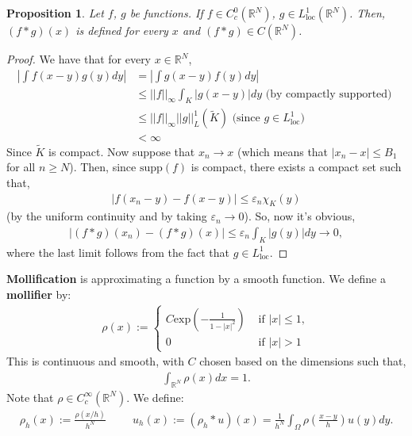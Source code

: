 \documentclass[psamsfonts]{amsart}
\newtheorem{prop}[thm]{Proposition}
\theoremstyle{definition}
\theoremstyle{remark}
\newcommand{\R}[0]{\mathbb{R}}
\newcommand{\eps}[0]{\varepsilon}
\numberwithin{equation}{section}
\begin{document}
\begin{prop}
	Let \( f \), \( g \) be functions. If \( f \in C_c^0(\R^N) \),  \( g \in L^1_{\text{loc}}(\R^N) \). Then, \( (f *g)(x) \) is defined for every \( x \) and \( (f*g) \in C(\R^N) \). 
\end{prop}

\begin{proof}
	We have that for every \( x \in \R^N \), 
	\begin{align*}
		 \left| \int f(x-y)g(y)dy \right| & = \left| \int g(x-y)f(y)dy \right| \\
		 & \leq || f ||_\infty \int_K |g(x-y)| dy \text{ (by compactly supported) } \\
		 & \leq ||f||_\infty ||g||_L^1(\tilde{K}) \text{ (since } g \in L^1_{\text{loc}} \text{)}\\
		 & < \infty 
	\end{align*}
	Since \( \tilde{K} \) is compact. Now suppose that \( x_n \rightarrow x \) (which means that \( |x_n - x| \leq B_1 \) for all \( n \geq N \)). Then, since \( \text{supp}(f) \) is compact, there exists a compact set such that, 
	\begin{align*}
		| f(x_n - y) - f(x-y) | \leq \varepsilon_n \chi_K(y) 
	\end{align*}
	(by the uniform continuity and by taking \( \eps_n \rightarrow 0 \)). So, now it's obvious, 
	\begin{align*}
		| (f*g)(x_n) - (f*g)(x) | \leq \eps_n \int_K |g(y)|dy \rightarrow 0, 
	\end{align*}
	where the last limit follows from the fact that \( g \in L^1_{\text{loc}}\).
\end{proof}

\textbf{Mollification} is approximating a function by a smooth function. We define a \textbf{mollifier} by:
\begin{align*}
	\rho(x) := \begin{cases}
		C \text{exp} \left( - \frac{1}{1-|x|^2} \right) & \text{ if } |x| \leq 1, \\
		0 & \text{ if } |x| > 1
	\end{cases}
\end{align*}
This is continuous and smooth, with \( C \) chosen based on the dimensions such that, 
\begin{align*}
		\int_{\R^N} \rho(x) dx = 1.
\end{align*}
Note that \( \rho \in C_c^\infty (\R^N) \). We define: 
\begin{align*}
	\rho_h(x) := \frac{\rho(x/h)}{h^N} \hspace{1cm} u_h(x) := (\rho_h * u)(x) = \frac{1}{h^N} \int_{\Omega} \rho \left( \frac{x-y}{h} \right) u(y)dy.
\end{align*}
\end{document}
